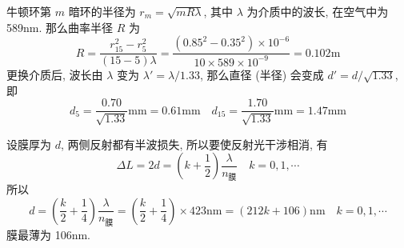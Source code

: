 \documentclass[11pt]{homework}
\begin{document}
\question
\begin{arabicparts}
    \questionpart 牛顿环第 $m$ 暗环的半径为 $r_m=\sqrt{mR\lambda}$, 其中 $\lambda$ 为介质中的波长, 在空气中为 589nm. 那么曲率半径 $R$ 为
    \begin{equation}
        R=\frac{r_{15}^2-r_{5}^2}{(15-5)\lambda}=\frac{\left(0.85^2-0.35^2\right)\times 10^{-6}}{10\times 589\times 10^{-9}}=0.102\mathrm{m}
    \end{equation}
    \questionpart 更换介质后, 波长由 $\lambda$ 变为 $\lambda'=\lambda/1.33$, 那么直径 (半径) 会变成 $d'=d/\sqrt{1.33}$, 即
    \begin{equation}
        d_5=\frac{0.70}{\sqrt{1.33}}\mathrm{mm}=0.61\mathrm{mm}\quad d_{15}=\frac{1.70}{\sqrt{1.33}}\mathrm{mm}=1.47\mathrm{mm}
    \end{equation}
\end{arabicparts}

\question
设膜厚为 $d$, 两侧反射都有半波损失, 所以要使反射光干涉相消, 有
\begin{equation}
    \Delta L = 2d = \left(k + \frac{1}{2}\right)\frac{\lambda}{n_{\text{膜}}}\quad k=0,1,\cdots
\end{equation}
所以
\begin{equation}
    d = \left(\frac{k}{2} + \frac{1}{4}\right)\frac{\lambda}{n_{\text{膜}}}=\left(\frac{k}{2} + \frac{1}{4}\right)\times 423\mathrm{nm} = \left(212k+106\right)\mathrm{nm}\quad k=0,1,\cdots
\end{equation}
膜最薄为 106nm.
\end{document}
